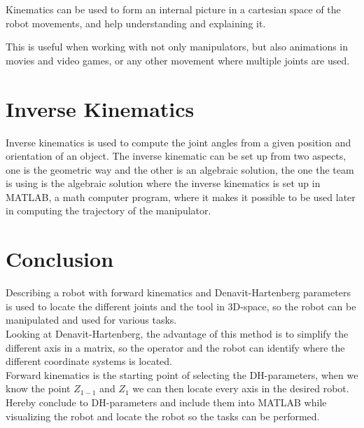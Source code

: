 Kinematics can be used to form an internal picture in a cartesian space  of the robot movements, and help understanding and explaining it. 

This is useful when working with not only manipulators, but also animations in movies and video games, or any other movement where multiple joints are used. 



\section{Inverse Kinematics}
Inverse kinematics is used to compute the joint angles from a given position and orientation of an object\cite{JohnC}. The inverse kinematic can be set up from two aspects, one is the geometric way and the other is an algebraic solution, the one the team is using is the algebraic solution where the inverse kinematics is set up in MATLAB, a math computer program, where it makes it possible to be used later in computing the trajectory of the manipulator.\\




\section{Conclusion} 

Describing a robot with forward kinematics and Denavit-Hartenberg parameters is used to locate the different joints and the tool in 3D-space, so the robot can be manipulated and used for various tasks.\\
Looking at Denavit-Hartenberg, the advantage of this method is to simplify the different axis in a matrix, so the operator and the robot can identify where the different coordinate systems is located.\\
Forward kinematics is the starting point of selecting the DH-parameters, when we know the point $Z_{1-1}$ and $Z_1$ we can then locate every axis in the desired robot. Hereby conclude to DH-parameters and include them into MATLAB while visualizing the robot and locate the robot so the tasks can be performed.\\











